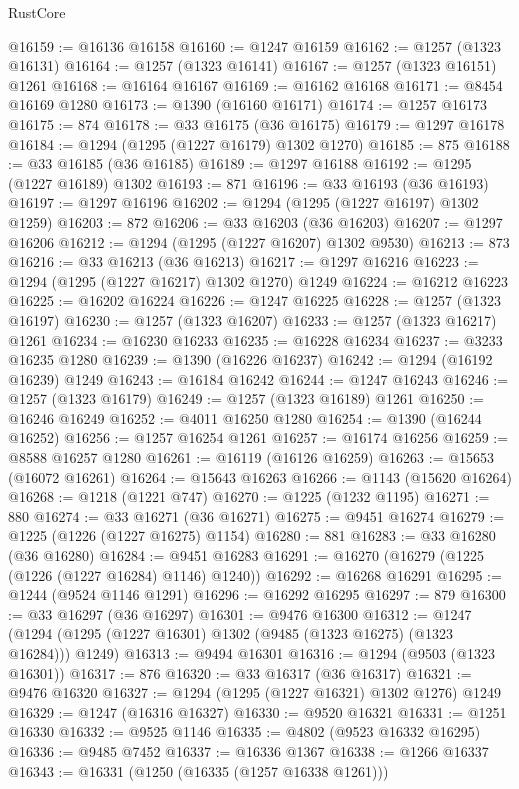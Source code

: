 \begin{lexlean}{RustCore}
\begin{coremodule}
@16159 := @16136 @16158
@16160 := @1247 @16159
@16162 := @1257 (@1323 @16131)
@16164 := @1257 (@1323 @16141)
@16167 := @1257 (@1323 @16151) @1261
@16168 := @16164 @16167
@16169 := @16162 @16168
@16171 := @8454 @16169 @1280
@16173 := @1390 (@16160 @16171)
@16174 := @1257 @16173
@16175 := 874
@16178 := @33 @16175 (@36 @16175)
@16179 := @1297 @16178
@16184 := @1294 (@1295 (@1227 @16179) @1302 @1270)
@16185 := 875
@16188 := @33 @16185 (@36 @16185)
@16189 := @1297 @16188
@16192 := @1295 (@1227 @16189) @1302
@16193 := 871
@16196 := @33 @16193 (@36 @16193)
@16197 := @1297 @16196
@16202 := @1294 (@1295 (@1227 @16197) @1302 @1259)
@16203 := 872
@16206 := @33 @16203 (@36 @16203)
@16207 := @1297 @16206
@16212 := @1294 (@1295 (@1227 @16207) @1302 @9530)
@16213 := 873
@16216 := @33 @16213 (@36 @16213)
@16217 := @1297 @16216
@16223 := @1294 (@1295 (@1227 @16217) @1302 @1270) @1249
@16224 := @16212 @16223
@16225 := @16202 @16224
@16226 := @1247 @16225
@16228 := @1257 (@1323 @16197)
@16230 := @1257 (@1323 @16207)
@16233 := @1257 (@1323 @16217) @1261
@16234 := @16230 @16233
@16235 := @16228 @16234
@16237 := @3233 @16235 @1280
@16239 := @1390 (@16226 @16237)
@16242 := @1294 (@16192 @16239) @1249
@16243 := @16184 @16242
@16244 := @1247 @16243
@16246 := @1257 (@1323 @16179)
@16249 := @1257 (@1323 @16189) @1261
@16250 := @16246 @16249
@16252 := @4011 @16250 @1280
@16254 := @1390 (@16244 @16252)
@16256 := @1257 @16254 @1261
@16257 := @16174 @16256
@16259 := @8588 @16257 @1280
@16261 := @16119 (@16126 @16259)
@16263 := @15653 (@16072 @16261)
@16264 := @15643 @16263
@16266 := @1143 (@15620 @16264)
@16268 := @1218 (@1221 @747)
@16270 := @1225 (@1232 @1195)
@16271 := 880
@16274 := @33 @16271 (@36 @16271)
@16275 := @9451 @16274
@16279 := @1225 (@1226 (@1227 @16275) @1154)
@16280 := 881
@16283 := @33 @16280 (@36 @16280)
@16284 := @9451 @16283
@16291 := @16270 (@16279 (@1225 (@1226 (@1227 @16284) @1146) @1240))
@16292 := @16268 @16291
@16295 := @1244 (@9524 @1146 @1291)
@16296 := @16292 @16295
@16297 := 879
@16300 := @33 @16297 (@36 @16297)
@16301 := @9476 @16300
@16312 := @1247 (@1294 (@1295 (@1227 @16301) @1302 (@9485 (@1323 @16275) (@1323 @16284))) @1249)
@16313 := @9494 @16301
@16316 := @1294 (@9503 (@1323 @16301))
@16317 := 876
@16320 := @33 @16317 (@36 @16317)
@16321 := @9476 @16320
@16327 := @1294 (@1295 (@1227 @16321) @1302 @1276) @1249
@16329 := @1247 (@16316 @16327)
@16330 := @9520 @16321
@16331 := @1251 @16330
@16332 := @9525 @1146
@16335 := @4802 (@9523 @16332 @16295)
@16336 := @9485 @7452
@16337 := @16336 @1367
@16338 := @1266 @16337
@16343 := @16331 (@1250 (@16335 (@1257 @16338 @1261)))

\end{coremodule}
\end{lexlean}
